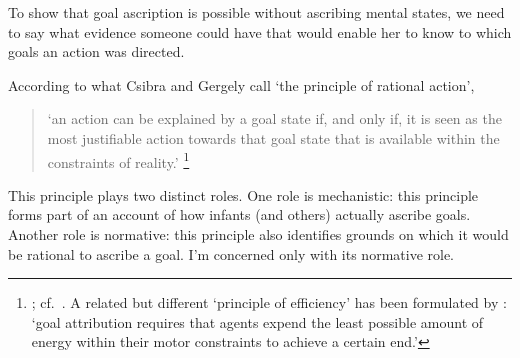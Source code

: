 \documentclass[12pt,\papersize]{extarticle}
\begin{document}
To show that goal ascription is possible without ascribing mental states, we need to say what evidence someone could have that would enable her to know to which goals an action was directed.

According to 
what Csibra and Gergely call `the principle of rational action',
%
\begin{quote}
`an action can be explained by a goal state if, and only if, it is seen as the most justifiable action towards that goal state that is available within the constraints of reality.'%
\footnote{
\citet[p.\ 255]{Csibra:1998cx}; cf.\ \citet{Csibra:2003jv}.
A related but different `principle of efficiency' has been formulated by \citet[p.\ 1061]{Southgate:2008el}:
`goal attribution requires that agents expend the least possible amount of energy within their motor constraints to achieve a certain end.'
}
\end{quote}
%
This principle plays two distinct roles.
One role is mechanistic: this principle forms part of an account of how infants (and others) actually ascribe goals.
Another role is normative: this principle also identifies grounds on which it would be rational to ascribe a goal.
I'm concerned only with its normative role.
\end{document}

